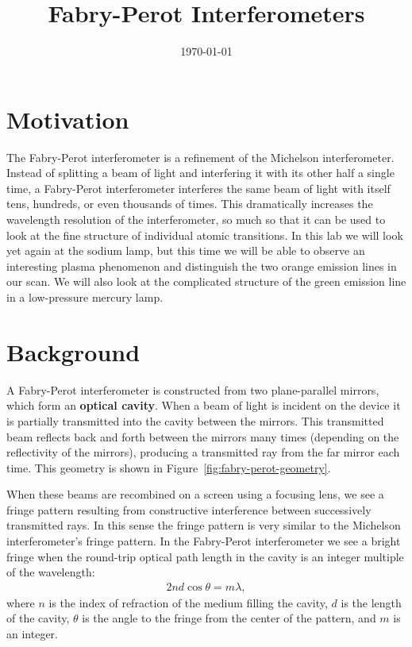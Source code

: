 \documentclass[]{manual}
\title{Fabry-Perot Interferometers}
\date{\today}
\begin{document}
    \maketitle
    \thispagestyle{firstpage}


    \section{Motivation}

    The Fabry-Perot interferometer is a refinement of the Michelson interferometer.
    Instead of splitting a beam of light and interfering it with its other half a single time, a Fabry-Perot interferometer interferes the same beam of light with itself tens, hundreds, or even thousands of times.
    This dramatically increases the wavelength resolution of the interferometer, so much so that it can be used to look at the fine structure of individual atomic transitions.
    In this lab we will look yet again at the sodium lamp, but this time we will be able to observe an interesting plasma phenomenon and distinguish the two orange emission lines in our scan.
    We will also look at the complicated structure of the green emission line in a low-pressure mercury lamp.

    \section{Background}

    A Fabry-Perot interferometer is constructed from two plane-parallel mirrors, which form an \textbf{optical cavity}.
    When a beam of light is incident on the device it is partially transmitted into the cavity between the mirrors.
    This transmitted beam reflects back and forth between the mirrors many times (depending on the reflectivity of the mirrors), producing a transmitted ray from the far mirror each time.
    This geometry is shown in Figure~\ref{fig:fabry-perot-geometry}.

    When these beams are recombined on a screen using a focusing lens, we see a fringe pattern resulting from constructive interference between successively transmitted rays.
    In this sense the fringe pattern is very similar to the Michelson interferometer's fringe pattern.
    In the Fabry-Perot interferometer we see a bright fringe when the round-trip optical path length in the cavity is an integer multiple of the wavelength:
    \begin{align}  \label{eqn:fabry-perot-fringes}
        2nd \cos{\theta} = m \lambda,
    \end{align}
    where $n$ is the index of refraction of the medium filling the cavity, $d$ is the length of the cavity, $\theta$ is the angle to the fringe from the center of the pattern, and $m$ is an integer.
\end{document}
